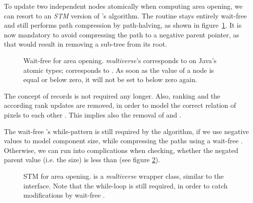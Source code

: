 To update two independent nodes atomically when computing area opening, we can
resort to an \emph{STM} version of \citeauthor{Anderson1994Waitfree}'s
algorithm. The  routine stays entirely wait-free and still
performs path compression by path-halving, as shown in
figure~\ref{fig:union-find-wf-stm-find}. It is now mandatory to avoid compressing the path
to a negative parent pointer, as that would result in removing a sub-tree from
its root.

\begin{figure}
  \centering
  
  \caption[Wait-free  for area opening.]{Wait-free
     for area opening. \emph{multiverse}'s
     corresponds to  on Java's atomic
    types;  corresponds to
    . As soon as the  value of a
    node is equal or below zero, it will not be set to below zero again.}
  \label{fig:union-find-wf-stm-find}
\end{figure}

The concept of records is not required any longer. Also, ranking and the
according rank updates are removed, in order to model the correct relation of
pixels to each other \cite{Meijster2002Comparison}. This implies also the
removal of  and .

The wait-free 's while-pattern is still required by the
algorithm, if we use negative values to model component size, while compressing
the paths using a wait-free . Otherwise, we can run into
complications when checking, whether the negated parent value (i.e. the size) is
less than  (see figure \ref{fig:union-find-wf-stm-union}).

\begin{figure}
  \centering
  
  \caption[STM  for area opening.]{STM  for
    area opening.  is a \emph{multiverse} wrapper
    class, similar to the  interface. Note that the
    while-loop is still required, in order to catch modifications by wait-free
    .}
  \label{fig:union-find-wf-stm-union}
\end{figure}

